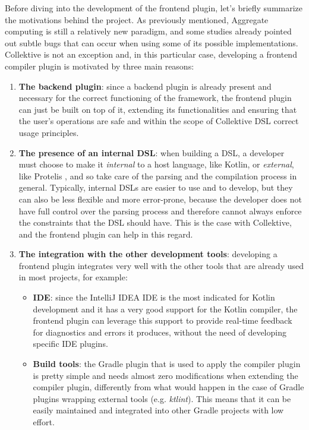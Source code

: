 \documentclass[12pt,a4paper,openright,twoside]{book}
\begin{document}
Before diving into the development of the frontend plugin, let's briefly
summarize the motivations behind the project. As previously mentioned, Aggregate
computing is still a relatively new paradigm, and some studies
\cite{DBLP:conf/saso/AudritoDVC16} already pointed out subtle bugs that can
occur when using some of its possible implementations. 
%
Collektive is not an exception and, in this particular case, developing a
frontend compiler plugin is motivated by three main reasons:
\begin{enumerate}
  \item \textbf{The backend plugin}: since a backend plugin is already present
  and necessary for the correct functioning of the framework, the frontend
  plugin can just be built on top of it, extending its functionalities and
  ensuring that the user's operations are safe and within the scope of
  Collektive DSL correct usage principles.

  \item \textbf{The presence of an internal DSL}: when building a DSL, a
  developer must choose to make it \emph{internal} to a host language, like
  Kotlin, or \emph{external}, like Protelis \cite{DBLP:conf/saso/PianiniBV17},
  and so take care of the parsing and the compilation process in general.
  Typically, internal DSLs are easier to use and to develop, but they can also
  be less flexible and more error-prone, because the developer does not have
  full control over the parsing process and therefore cannot always enforce the
  constraints that the DSL should have. This is the case with Collektive, and
  the frontend plugin can help in this regard.
  
  \item \textbf{The integration with the other development tools}: developing a
  frontend plugin integrates very well with the other tools that are already 
  used in most projects, for example:

  \begin{itemize}
    \item \textbf{IDE}: since the IntelliJ IDEA \ac{IDE} is the most indicated
    for Kotlin development and it has a very good support for the Kotlin
    compiler, the frontend plugin can leverage this support to provide real-time
    feedback for diagnostics and errors it produces, without the need of
    developing specific \ac{IDE} plugins.

    \item \textbf{Build tools}: the Gradle plugin that is used to apply the
    compiler plugin is pretty simple and needs almost zero modifications when
    extending the compiler plugin, differently from what would happen in the
    case of Gradle plugins wrapping external tools (e.g. \emph{ktlint}). This
    means that it can be easily maintained and integrated into other Gradle
    projects with low effort.


\end{itemize}
\end{enumerate}
\end{document}

